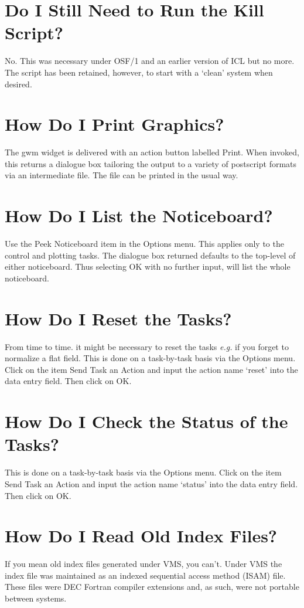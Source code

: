 \documentclass[a4paper]{book}
\renewcommand{\_}{{\tt\char'137}}
\begin{document}
\section{Do I Still Need to Run the Kill Script?}
No. This was necessary under OSF/1 and an earlier version of ICL but no more. The
script has been retained, however, to start with a `clean' system when desired.

\section{How Do I Print Graphics?}
The {\sc gwm} widget is delivered with an action button labelled {\sf Print}. When
invoked, this returns a dialogue box tailoring the output to a variety of postscript
formats via an intermediate file. The file can be printed in the usual way.

\section{How Do I List the Noticeboard?}
Use the {\sf Peek Noticeboard} item in the {\sf Options} menu. This applies only to
the control and plotting tasks. The dialogue box returned defaults to the top-level
of either noticeboard. Thus selecting {\sf OK} with no further input, will list the
whole noticeboard.

\section{How Do I Reset the Tasks?}
\label{reset}
From time to time. it might be necessary to reset the tasks {\em e.g.} if you forget to
normalize a {\sc flat} field. This is done on a task-by-task basis via the {\sf Options}
menu. Click on the item {\sf Send Task an Action} and input the action name `reset'
into the data entry field. Then click on {\sf OK}.

\section{How Do I Check the Status of the Tasks?}
This is done on a task-by-task basis via the {\sf Options}
menu. Click on the item {\sf Send Task an Action} and input the action name `status'
into the data entry field. Then click on {\sf OK}.

\section{How Do I Read Old Index Files?}
If you mean old index files generated under VMS, you can't. Under VMS the index file was maintained as an indexed sequential
access method (ISAM) file. These files were DEC Fortran compiler extensions and, as such,
were not portable between systems.
\end{document}
